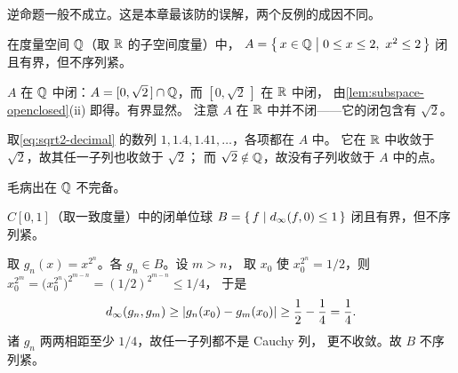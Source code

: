 逆命题一般不成立。这是本章最该防的误解，两个反例的成因不同。

\begin{example}
  \label{ex:q-closed-bounded}
  在度量空间 \(\mathbb{Q}\)（取 \(\mathbb{R}\) 的子空间度量）中，
  \(A = \left\{\,x \in \mathbb{Q} \;\middle|\; 0 \le x \le 2,\ x^{2} \le 2\,\right\}\) 闭且有界，但不序列紧。
  \begin{worked}
    \(A\) 在 \(\mathbb{Q}\) 中闭：\(A = [0,\sqrt2\,] \cap \mathbb{Q}\)，而 \([0,\sqrt2\,]\) 在 \(\mathbb{R}\) 中闭，
    由\cref{lem:subspace-openclosed}(ii) 即得。有界显然。
    注意 \(A\) 在 \(\mathbb{R}\) 中并不闭——它的闭包含有 \(\sqrt2\)。

    取\cref{eq:sqrt2-decimal} 的数列 \(1, 1.4, 1.41, \dots\)，各项都在 \(A\) 中。
    它在 \(\mathbb{R}\) 中收敛于 \(\sqrt{2}\)，故其任一子列也收敛于 \(\sqrt{2}\)；
    而 \(\sqrt{2} \notin \mathbb{Q}\)，故没有子列收敛于 \(A\) 中的点。

    毛病出在 \(\mathbb{Q}\) 不完备。
  \end{worked}
\end{example}

\begin{example}
  \label{ex:ball-not-compact}
  \(C[0,1]\)（取一致度量）中的闭单位球
  \(B = \left\{\,f \;\middle|\; d_{\infty}(f,0) \le 1\,\right\}\) 闭且有界，但不序列紧。
  \begin{worked}
    取 \(g_{n}(x) = x^{2^{n}}\)。各 \(g_{n} \in B\)。设 \(m > n\)，
    取 \(x_{0}\) 使 \(x_{0}^{2^{n}} = 1/2\)，则
    \(x_{0}^{2^{m}} = \bigl(x_{0}^{2^{n}}\bigr)^{2^{m-n}} = (1/2)^{2^{m-n}} \le 1/4\)，
    于是
    \begin{equation}
      \label{eq:separated}
      d_{\infty}(g_{n},g_{m}) \ge \lvert g_{n}(x_{0}) - g_{m}(x_{0})\rvert
        \ge \frac{1}{2} - \frac{1}{4} = \frac{1}{4}.
    \end{equation}
    诸 \(g_{n}\) 两两相距至少 \(1/4\)，故任一子列都不是 Cauchy 列，
    更不收敛。故 \(B\) 不序列紧。
  \end{worked}
\end{example}

